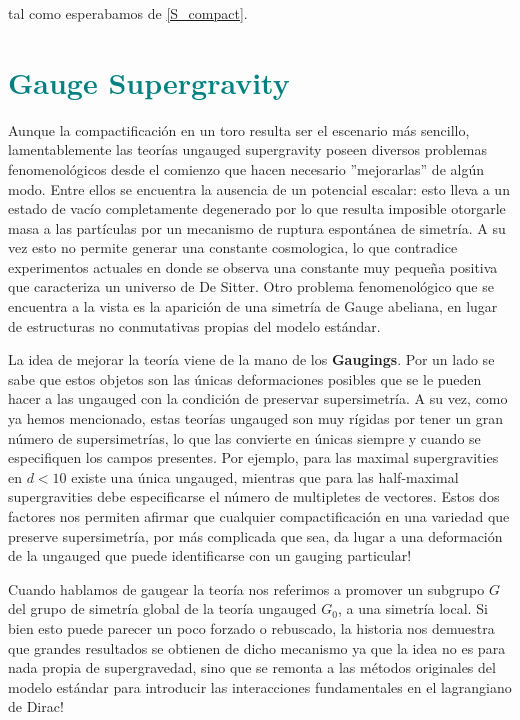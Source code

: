 \documentclass{article}
\numberwithin{equation}{section}
\begin{document}
tal como esperabamos de \ref{S_compact}.

\section{\textcolor{teal}{Gauge Supergravity}}\label{sec_gaugedsugra}

Aunque la compactificación en un toro resulta ser el escenario más sencillo, lamentablemente las teorías ungauged supergravity poseen diversos problemas fenomenológicos desde el comienzo que hacen necesario ''mejorarlas'' de algún modo. Entre ellos se encuentra la ausencia de un potencial escalar: esto lleva a un estado de vacío completamente degenerado por lo que resulta imposible otorgarle masa a las partículas por un mecanismo de ruptura espontánea de simetría. A su vez esto no permite generar una constante cosmologica, lo que contradice experimentos actuales en donde se observa una constante muy pequeña positiva que caracteriza un universo de De Sitter. Otro problema fenomenológico que se encuentra a la vista es la aparición de una simetría de Gauge abeliana, en lugar de estructuras no conmutativas propias del modelo estándar. 

La idea de mejorar la teoría viene de la mano de los \textbf{Gaugings}. Por un lado se sabe que estos objetos son las únicas deformaciones posibles que se le pueden hacer a las ungauged con la condición de preservar supersimetría. 
A su vez, como ya hemos mencionado, estas teorías ungauged son muy rígidas por tener un gran número de supersimetrías, lo que las convierte en únicas siempre y cuando se especifiquen los campos presentes. Por ejemplo, para las maximal supergravities en $ d<10 $ existe una única ungauged, mientras que para las half-maximal supergravities debe especificarse el número de multipletes de vectores.
Estos dos factores nos permiten afirmar que cualquier compactificación en una variedad que preserve supersimetría, por más complicada que sea, da lugar a una deformación de la ungauged que puede identificarse con un gauging particular!

Cuando hablamos de gaugear la teoría nos referimos a promover un subgrupo $ G $ del grupo de simetría global de la teoría ungauged $ G_0 $, a una simetría local. Si bien esto puede parecer un poco forzado o rebuscado, la historia nos demuestra que grandes resultados se obtienen de dicho mecanismo ya que la idea no es para nada propia de supergravedad, sino que se remonta a las métodos originales del modelo estándar para introducir las interacciones fundamentales en el lagrangiano de Dirac! 
\end{document}
